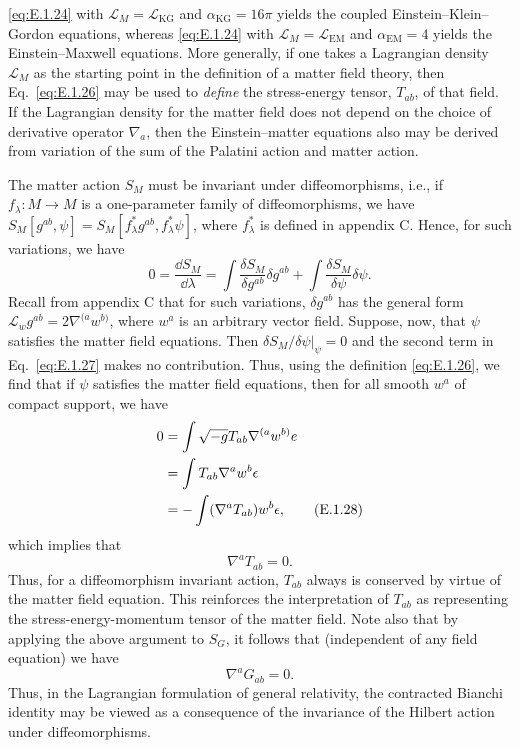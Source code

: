 \eqref{eq:E.1.24} with \(\mathcal L_M=\mathcal L_{\mathrm{KG}}\) and
\(\alpha_{\mathrm{KG}}=16\pi\) yields the coupled Einstein--Klein--Gordon
equations, whereas \eqref{eq:E.1.24} with
\(\mathcal L_M=\mathcal L_{\mathrm{EM}}\) and \(\alpha_{\mathrm{EM}}=4\) yields the
Einstein--Maxwell equations. More generally, if one takes a Lagrangian density
\(\mathcal L_M\) as the starting point in the definition of a matter field theory,
then Eq.~\eqref{eq:E.1.26} may be used to \emph{define} the stress-energy tensor,
\(T_{ab}\), of that field. If the Lagrangian density for the matter field does not
depend on the choice of derivative operator \(\nabla_a\), then the Einstein--matter
equations also may be derived from variation of the sum of the Palatini action and
matter action.

The matter action \(S_M\) must be invariant under diffeomorphisms, i.e., if
\(f_\lambda:M\to M\) is a one-parameter family of diffeomorphisms, we have
\(S_M[g^{ab},\psi]=S_M[f_\lambda^*g^{ab},f_\lambda^*\psi]\), where
\(f_\lambda^*\) is defined in appendix C. Hence, for such variations, we have
\begin{equation}
  0=\frac{\dd S_M}{\dd\lambda}
    =\int\frac{\delta S_M}{\delta g^{ab}}\delta g^{ab}
      +\int\frac{\delta S_M}{\delta\psi}\delta\psi .
  \tag{E.1.27}\label{eq:E.1.27}
\end{equation}
Recall from appendix C that for such variations, \(\delta g^{ab}\) has the general
form \(\mathcal L_w g^{ab}=2\nabla^{(a}w^{b)}\), where \(w^a\) is an arbitrary
vector field. Suppose, now, that \(\psi\) satisfies the matter field equations. Then
\(\left.\delta S_M/\delta\psi\right|_\psi=0\) and the second term in
Eq.~\eqref{eq:E.1.27} makes no contribution. Thus, using the definition
\eqref{eq:E.1.26}, we find that if \(\psi\) satisfies the matter field equations,
then for all smooth \(w^a\) of compact support, we have
\begin{align}
  0
    &=\int\sqrt{-g}T_{ab}\nabla^{(a}w^{b)}e\notag\\
    &=\int T_{ab}\nabla^a w^b\epsilon\notag\\
    &=-\int(\nabla^aT_{ab})w^b\epsilon ,
  \tag{E.1.28}\label{eq:E.1.28}
\end{align}
which implies that
\begin{equation}
  \nabla^aT_{ab}=0.
  \tag{E.1.29}\label{eq:E.1.29}
\end{equation}
Thus, for a diffeomorphism invariant action, \(T_{ab}\) always is conserved by
virtue of the matter field equation. This reinforces the interpretation of \(T_{ab}\)
as representing the stress-energy-momentum tensor of the matter field. Note also
that by applying the above argument to \(S_G\), it follows that (independent of any
field equation) we have
\begin{equation}
  \nabla^aG_{ab}=0.
  \tag{E.1.30}\label{eq:E.1.30}
\end{equation}
Thus, in the Lagrangian formulation of general relativity, the contracted Bianchi
identity may be viewed as a consequence of the invariance of the Hilbert action
under diffeomorphisms.

